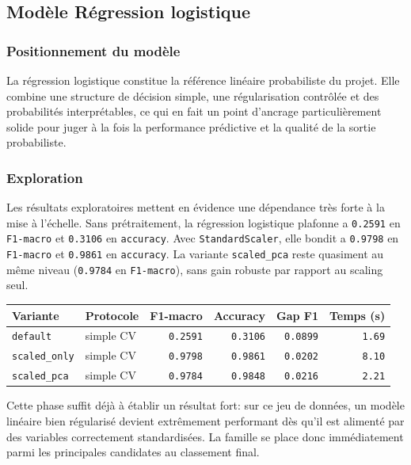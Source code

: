 \subsection{Modèle Régression logistique}

\subsubsection{Positionnement du modèle}
La régression logistique constitue la référence linéaire probabiliste du projet. Elle combine une structure de décision simple, une régularisation contrôlée et des probabilités interprétables, ce qui en fait un point d'ancrage particulièrement solide pour juger à la fois la performance prédictive et la qualité de la sortie probabiliste.

\subsubsection{Exploration}
Les résultats exploratoires mettent en évidence une dépendance très forte à la mise à l'échelle. Sans prétraitement, la régression logistique plafonne a \texttt{0.2591} en \texttt{F1-macro} et \texttt{0.3106} en \texttt{accuracy}. Avec \texttt{StandardScaler}, elle bondit a \texttt{0.9798} en \texttt{F1-macro} et \texttt{0.9861} en \texttt{accuracy}. La variante \texttt{scaled\_pca} reste quasiment au même niveau (\texttt{0.9784} en \texttt{F1-macro}), sans gain robuste par rapport au scaling seul.

\begin{table}[H]
\centering
\begin{tabular}{|l|l|r|r|r|r|}
\hline
\textbf{Variante} & \textbf{Protocole} & \textbf{F1-macro} & \textbf{Accuracy} & \textbf{Gap F1} & \textbf{Temps (s)} \\
\hline
\texttt{default} & simple CV & \texttt{0.2591} & \texttt{0.3106} & \texttt{0.0899} & \texttt{1.69} \\
\texttt{scaled\_only} & simple CV & \texttt{0.9798} & \texttt{0.9861} & \texttt{0.0202} & \texttt{8.10} \\
\texttt{scaled\_pca} & simple CV & \texttt{0.9784} & \texttt{0.9848} & \texttt{0.0216} & \texttt{2.21} \\
\hline
\end{tabular}
\end{table}

Cette phase suffit déjà à établir un résultat fort: sur ce jeu de données, un modèle linéaire bien régularisé devient extrêmement performant dès qu'il est alimenté par des variables correctement standardisées. La famille se place donc immédiatement parmi les principales candidates au classement final.

